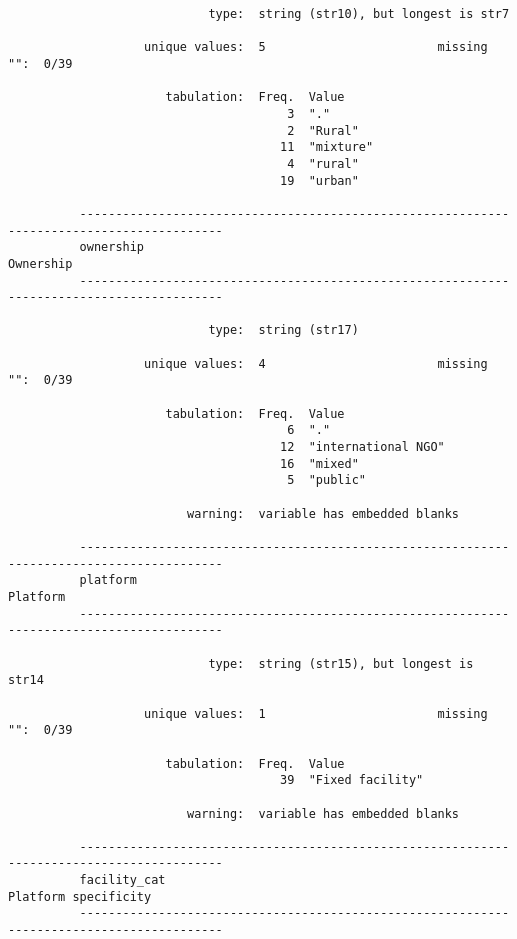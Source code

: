 \documentclass{article}
\begin{document}
\begin{verbatim}
                            type:  string (str10), but longest is str7
          
                   unique values:  5                        missing "":  0/39
          
                      tabulation:  Freq.  Value
                                       3  "."
                                       2  "Rural"
                                      11  "mixture"
                                       4  "rural"
                                      19  "urban"
          
          ------------------------------------------------------------------------------------------
          ownership                                                                        Ownership
          ------------------------------------------------------------------------------------------
          
                            type:  string (str17)
          
                   unique values:  4                        missing "":  0/39
          
                      tabulation:  Freq.  Value
                                       6  "."
                                      12  "international NGO"
                                      16  "mixed"
                                       5  "public"
          
                         warning:  variable has embedded blanks
          
          ------------------------------------------------------------------------------------------
          platform                                                                          Platform
          ------------------------------------------------------------------------------------------
          
                            type:  string (str15), but longest is str14
          
                   unique values:  1                        missing "":  0/39
          
                      tabulation:  Freq.  Value
                                      39  "Fixed facility"
          
                         warning:  variable has embedded blanks
          
          ------------------------------------------------------------------------------------------
          facility_cat                                                          Platform specificity
          ------------------------------------------------------------------------------------------
          

\end{verbatim}
\end{document}
